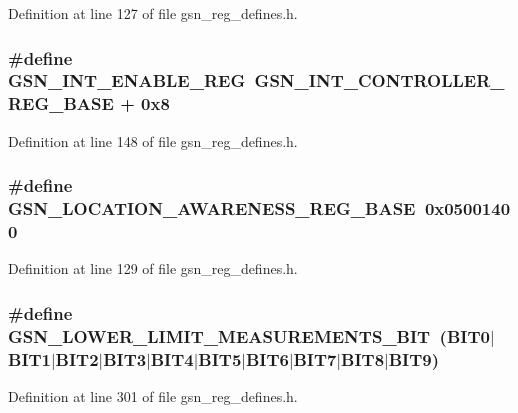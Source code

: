 Definition at line 127 of file gsn\_\-reg\_\-defines.h.

\hypertarget{a00546_a95aab250969f4bb12629690939190800}{
\subsubsection[{GSN\_\-INT\_\-ENABLE\_\-REG}]{\setlength{\rightskip}{0pt plus 5cm}\#define GSN\_\-INT\_\-ENABLE\_\-REG~GSN\_\-INT\_\-CONTROLLER\_\-REG\_\-BASE + 0x8}}
\label{a00546_a95aab250969f4bb12629690939190800}


Definition at line 148 of file gsn\_\-reg\_\-defines.h.

\hypertarget{a00546_ac76b8c53c454720941c9ddd67a94781f}{
\subsubsection[{GSN\_\-LOCATION\_\-AWARENESS\_\-REG\_\-BASE}]{\setlength{\rightskip}{0pt plus 5cm}\#define GSN\_\-LOCATION\_\-AWARENESS\_\-REG\_\-BASE~0x05001400}}
\label{a00546_ac76b8c53c454720941c9ddd67a94781f}


Definition at line 129 of file gsn\_\-reg\_\-defines.h.

\hypertarget{a00546_a1d8705153359bf571afdaa293740597e}{
\subsubsection[{GSN\_\-LOWER\_\-LIMIT\_\-MEASUREMENTS\_\-BIT}]{\setlength{\rightskip}{0pt plus 5cm}\#define GSN\_\-LOWER\_\-LIMIT\_\-MEASUREMENTS\_\-BIT~(BIT0$|$BIT1$|$BIT2$|$BIT3$|$BIT4$|$BIT5$|$BIT6$|$BIT7$|$BIT8$|$BIT9)}}
\label{a00546_a1d8705153359bf571afdaa293740597e}


Definition at line 301 of file gsn\_\-reg\_\-defines.h.

